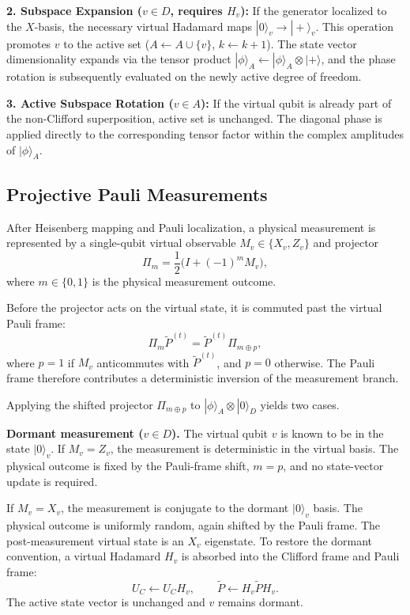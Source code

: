 \documentclass[a4paper, onecolumn, unpublished]{quantumarticle}
\begin{document}
    \textbf{2. Subspace Expansion ($v \in D$, requires $H_v$):}
    If the generator localized to the $X$-basis, the necessary virtual Hadamard maps $|0\rangle_v \to |+\rangle_v$. This operation promotes $v$ to the active set ($A \leftarrow A \cup \{v\}$, $k \leftarrow k+1$). The state vector dimensionality expands via the tensor product $|\phi\rangle_A \leftarrow |\phi\rangle_A \otimes |+\rangle$, and the phase rotation is subsequently evaluated on the newly active degree of freedom.

    \textbf{3. Active Subspace Rotation ($v \in A$):}
    If the virtual qubit is already part of the non-Clifford superposition, active set is unchanged. The diagonal phase is applied directly to the corresponding tensor factor within the complex amplitudes of $|\phi\rangle_A$.

    \subsection{Projective Pauli Measurements}
    \label{app:measurement_updates}

    After Heisenberg mapping and Pauli localization, a physical measurement is represented by a single-qubit virtual observable $M_v \in \{X_v,Z_v\}$ and projector
    \begin{equation}
        \Pi_m = \frac{1}{2}\bigl(I + (-1)^m M_v\bigr),
    \end{equation}
    where $m \in \{0,1\}$ is the physical measurement outcome.

    Before the projector acts on the virtual state, it is commuted past the virtual Pauli frame:
    \begin{equation}
        \Pi_m \tilde{P}^{(t)}
        =
        \tilde{P}^{(t)} \Pi_{m \oplus p},
    \end{equation}
    where $p=1$ if $M_v$ anticommutes with $\tilde{P}^{(t)}$, and $p=0$ otherwise. The Pauli frame therefore contributes a deterministic inversion of the measurement branch.

    Applying the shifted projector $\Pi_{m \oplus p}$ to
    $|\phi\rangle_A \otimes |0\rangle_D$ yields two cases.

    \textbf{Dormant measurement ($v \in D$).}
    The virtual qubit $v$ is known to be in the state $|0\rangle_v$.
    If $M_v=Z_v$, the measurement is deterministic in the virtual basis. The physical outcome is fixed by the Pauli-frame shift, $m=p$, and no state-vector update is required.

    If $M_v=X_v$, the measurement is conjugate to the dormant $|0\rangle_v$ basis. The physical outcome is uniformly random, again shifted by the Pauli frame. The post-measurement virtual state is an $X_v$ eigenstate. To restore the dormant convention, a virtual Hadamard $H_v$ is absorbed into the Clifford frame and Pauli frame:
    \begin{equation}
        U_C \leftarrow U_C H_v,
        \qquad
        \tilde{P} \leftarrow H_v \tilde{P} H_v.
    \end{equation}
    The active state vector is unchanged and $v$ remains dormant.
\end{document}
